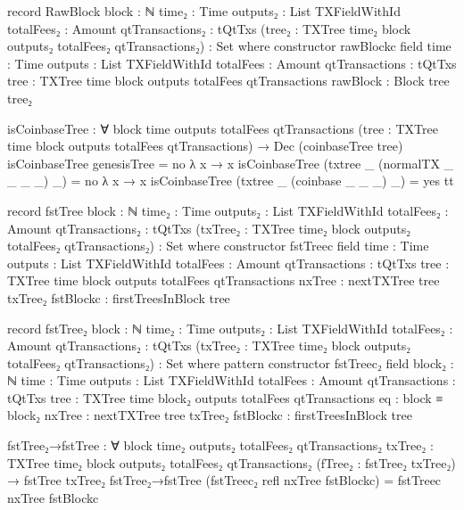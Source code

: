 \documentclass{beamer}
\begin{document}
\begin{code}
      record RawBlock
        {block : ℕ}
        {time₂ : Time}
        {outputs₂ : List TXFieldWithId}
        {totalFees₂ : Amount}
        {qtTransactions₂ : tQtTxs}
        (tree₂ : TXTree time₂ block outputs₂ totalFees₂ qtTransactions₂)
        : Set where
        constructor rawBlockc
        field
          {time}           : Time
          {outputs}        : List TXFieldWithId
          {totalFees}      : Amount
          {qtTransactions} : tQtTxs
          {tree}           : TXTree time block outputs totalFees qtTransactions
          rawBlock         : Block tree tree₂

      isCoinbaseTree : ∀
        {block time outputs totalFees qtTransactions}
        (tree : TXTree time block outputs totalFees qtTransactions)
        → Dec (coinbaseTree tree)
      isCoinbaseTree genesisTree = no λ x → x
      isCoinbaseTree (txtree _ (normalTX _ _ _ _) _) = no λ x → x
      isCoinbaseTree (txtree _ (coinbase _ _ _) _) = yes tt

      record fstTree
        {block : ℕ}
        {time₂ : Time}
        {outputs₂ : List TXFieldWithId}
        {totalFees₂ : Amount}
        {qtTransactions₂ : tQtTxs}
        (txTree₂ : TXTree time₂ block outputs₂ totalFees₂ qtTransactions₂)
        : Set where
        constructor fstTreec
        field
          {time}               : Time
          {outputs}            : List TXFieldWithId
          {totalFees}          : Amount
          {qtTransactions}     : tQtTxs
          {tree}               : TXTree time block outputs totalFees qtTransactions
          nxTree               : nextTXTree tree txTree₂
          fstBlockc            : firstTreesInBlock tree

      record fstTree₂
        {block : ℕ}
        {time₂ : Time}
        {outputs₂ : List TXFieldWithId}
        {totalFees₂ : Amount}
        {qtTransactions₂ : tQtTxs}
        (txTree₂ : TXTree time₂ block outputs₂ totalFees₂ qtTransactions₂)
        : Set where
        pattern
        constructor fstTreec₂
        field
          {block₂}              : ℕ
          {time}               : Time
          {outputs}            : List TXFieldWithId
          {totalFees}          : Amount
          {qtTransactions}     : tQtTxs
          {tree}               : TXTree time block₂ outputs totalFees qtTransactions
          eq                   : block ≡ block₂
          nxTree               : nextTXTree tree txTree₂
          fstBlockc            : firstTreesInBlock tree

      fstTree₂→fstTree : ∀
        {block time₂ outputs₂ totalFees₂ qtTransactions₂}
        {txTree₂ : TXTree time₂ block outputs₂ totalFees₂ qtTransactions₂}
        (fTree₂ : fstTree₂ txTree₂)
        → fstTree txTree₂
      fstTree₂→fstTree (fstTreec₂ refl nxTree fstBlockc) = fstTreec nxTree fstBlockc


\end{code}
\end{document}

